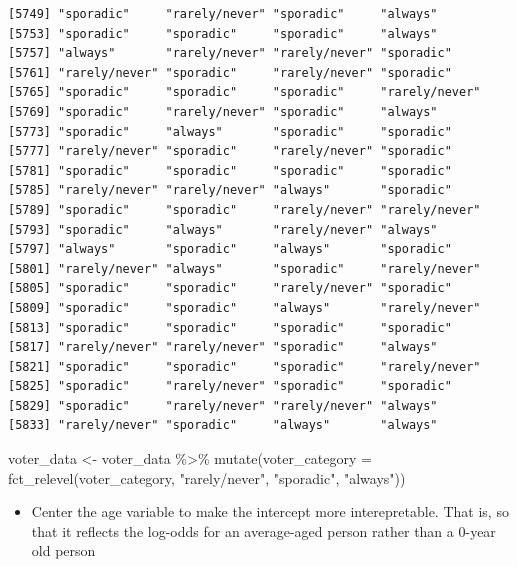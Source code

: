\documentclass[
  letterpaper,
  DIV=11,
  numbers=noendperiod]{scrartcl}
\newenvironment{Shaded}{\begin{snugshade}}{\end{snugshade}}
\newcommand{\AttributeTok}[1]{\textcolor[rgb]{0.40,0.45,0.13}{#1}}
\newcommand{\CommentTok}[1]{\textcolor[rgb]{0.37,0.37,0.37}{#1}}
\newcommand{\FunctionTok}[1]{\textcolor[rgb]{0.28,0.35,0.67}{#1}}
\newcommand{\NormalTok}[1]{\textcolor[rgb]{0.00,0.23,0.31}{#1}}
\newcommand{\OtherTok}[1]{\textcolor[rgb]{0.00,0.23,0.31}{#1}}
\newcommand{\SpecialCharTok}[1]{\textcolor[rgb]{0.37,0.37,0.37}{#1}}
\newcommand{\StringTok}[1]{\textcolor[rgb]{0.13,0.47,0.30}{#1}}
\providecommand{\tightlist}{%
  \setlength{\itemsep}{0pt}\setlength{\parskip}{0pt}}\usepackage{longtable,booktabs,array}
\begin{document}
\begin{verbatim}
[5749] "sporadic"     "rarely/never" "sporadic"     "always"      
[5753] "sporadic"     "sporadic"     "sporadic"     "always"      
[5757] "always"       "rarely/never" "rarely/never" "sporadic"    
[5761] "rarely/never" "sporadic"     "rarely/never" "sporadic"    
[5765] "sporadic"     "sporadic"     "sporadic"     "rarely/never"
[5769] "sporadic"     "rarely/never" "sporadic"     "always"      
[5773] "sporadic"     "always"       "sporadic"     "sporadic"    
[5777] "rarely/never" "sporadic"     "rarely/never" "sporadic"    
[5781] "sporadic"     "sporadic"     "sporadic"     "sporadic"    
[5785] "rarely/never" "rarely/never" "always"       "sporadic"    
[5789] "sporadic"     "sporadic"     "rarely/never" "rarely/never"
[5793] "sporadic"     "always"       "rarely/never" "always"      
[5797] "always"       "sporadic"     "always"       "sporadic"    
[5801] "rarely/never" "always"       "sporadic"     "rarely/never"
[5805] "sporadic"     "sporadic"     "rarely/never" "sporadic"    
[5809] "sporadic"     "sporadic"     "always"       "rarely/never"
[5813] "sporadic"     "sporadic"     "sporadic"     "sporadic"    
[5817] "rarely/never" "rarely/never" "sporadic"     "always"      
[5821] "sporadic"     "sporadic"     "sporadic"     "rarely/never"
[5825] "sporadic"     "rarely/never" "sporadic"     "sporadic"    
[5829] "sporadic"     "rarely/never" "rarely/never" "always"      
[5833] "rarely/never" "sporadic"     "always"       "always"      
\end{verbatim}

\begin{Shaded}
\begin{Highlighting}[]
\NormalTok{voter\_data }\OtherTok{\textless{}{-}}\NormalTok{ voter\_data }\SpecialCharTok{\%\textgreater{}\%}
  \FunctionTok{mutate}\NormalTok{(}\AttributeTok{voter\_category =} \FunctionTok{fct\_relevel}\NormalTok{(voter\_category, }\StringTok{"rarely/never"}\NormalTok{, }\StringTok{"sporadic"}\NormalTok{, }\StringTok{"always"}\NormalTok{))}
\end{Highlighting}
\end{Shaded}

\begin{itemize}
\tightlist
\item
  Center the age variable to make the intercept more interepretable.
  That is, so that it reflects the log-odds for an average-aged person
  rather than a 0-year old person
\end{itemize}

\begin{Shaded}
\end{Shaded}
\end{document}
